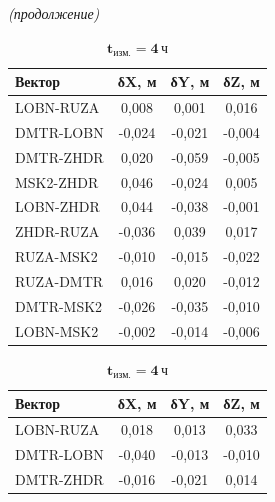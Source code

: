 \begin{table}		
		\ContinuedFloat
		\centering\small
		\centering\textit{(продолжение)}\\
		\begin{subtable}{.47\linewidth}	
			\centering
			\caption*{$\mathbf{t_\text{изм.}=3\,\text{ч}}$}
			\begin{tabular}{ l
					S[table-number-alignment = center]
					S[table-number-alignment = center]
					S[table-number-alignment = center] }
				
				
				\hline
				\textbf{Вектор}				& \textbf{δX, м}	& \textbf{δY, м}	& \textbf{δZ, м}	\\ \hline
				LOBN-RUZA					&      0,008		& 	   0,001		&      0,016		\\ %
				DMTR-LOBN					&     -0,024		&     -0,021		&     -0,004		\\ %
				DMTR-ZHDR					&      0,020		&     -0,059		&     -0,005		\\ %
				MSK2-ZHDR					&      0,046		&     -0,024		&      0,005		\\ %
				LOBN-ZHDR					&      0,044		&     -0,038		&     -0,001		\\ %
				ZHDR-RUZA					&     -0,036		&      0,039		&      0,017		\\ %
				RUZA-MSK2					&     -0,010		&     -0,015		&     -0,022		\\ %
				RUZA-DMTR					&      0,016		&      0,020		&     -0,012		\\ %
				DMTR-MSK2					&     -0,026		&     -0,035		&     -0,010		\\ %
				LOBN-MSK2					&     -0,002		&     -0,014		&     -0,006		\\ \hline				
			\end{tabular}
		\end{subtable}%
		\qquad
		\begin{subtable}{.47\linewidth}	
			\centering
			\caption*{$\mathbf{t_\text{изм.}=4\,\text{ч}}$}
			\begin{tabular}{ l
					S[table-number-alignment = center]
					S[table-number-alignment = center]
					S[table-number-alignment = center] }
				\hline
				\textbf{Вектор}				& \textbf{δX, м}	& \textbf{δY, м}	& \textbf{δZ, м}	\\ \hline
				LOBN-RUZA					&      0,018		& 	   0,013		&      0,033		\\ %
				DMTR-LOBN					&     -0,040		&     -0,013		&     -0,010		\\ %
				DMTR-ZHDR					&     -0,016		&     -0,021		&      0,014		\\ %

\end{tabular}
\end{subtable}
\end{table}
